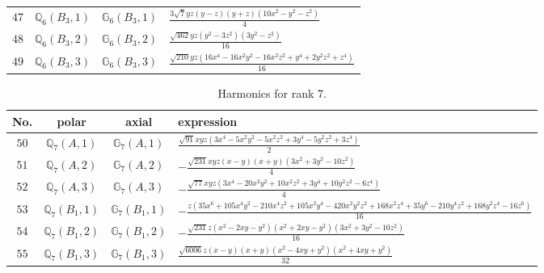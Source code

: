 \documentclass[fleqn,8pt,landscape]{jsarticle}
\begin{document}
\begin{table}[ht!]
\begin{center}
\begin{tabular}{cccl}
$ 47 $ & $ \mathbb{Q}_{6}(B_{3},1) $ & $ \mathbb{G}_{6}(B_{3},1) $ & $ \frac{3 \sqrt{7} y z \left(y - z\right) \left(y + z\right) \left(10 x^{2} - y^{2} - z^{2}\right)}{4} $ \\
$ 48 $ & $ \mathbb{Q}_{6}(B_{3},2) $ & $ \mathbb{G}_{6}(B_{3},2) $ & $ \frac{\sqrt{462} y z \left(y^{2} - 3 z^{2}\right) \left(3 y^{2} - z^{2}\right)}{16} $ \\
$ 49 $ & $ \mathbb{Q}_{6}(B_{3},3) $ & $ \mathbb{G}_{6}(B_{3},3) $ & $ \frac{\sqrt{210} y z \left(16 x^{4} - 16 x^{2} y^{2} - 16 x^{2} z^{2} + y^{4} + 2 y^{2} z^{2} + z^{4}\right)}{16} $ \\
 \hline \hline
\end{tabular}
\end{center}
\end{table}
\begin{table}[ht!]
\begin{center}
\caption{Harmonics for rank 7.}
\renewcommand{\arraystretch}{1.3}
\begin{tabular}{cccl} \hline \hline
No. & polar & axial & expression \\ \hline
$ 50 $ & $ \mathbb{Q}_{7}(A,1) $ & $ \mathbb{G}_{7}(A,1) $ & $ \frac{\sqrt{91} x y z \left(3 x^{4} - 5 x^{2} y^{2} - 5 x^{2} z^{2} + 3 y^{4} - 5 y^{2} z^{2} + 3 z^{4}\right)}{2} $ \\
$ 51 $ & $ \mathbb{Q}_{7}(A,2) $ & $ \mathbb{G}_{7}(A,2) $ & $ - \frac{\sqrt{231} x y z \left(x - y\right) \left(x + y\right) \left(3 x^{2} + 3 y^{2} - 10 z^{2}\right)}{4} $ \\
$ 52 $ & $ \mathbb{Q}_{7}(A,3) $ & $ \mathbb{G}_{7}(A,3) $ & $ - \frac{\sqrt{77} x y z \left(3 x^{4} - 20 x^{2} y^{2} + 10 x^{2} z^{2} + 3 y^{4} + 10 y^{2} z^{2} - 6 z^{4}\right)}{4} $ \\
$ 53 $ & $ \mathbb{Q}_{7}(B_{1},1) $ & $ \mathbb{G}_{7}(B_{1},1) $ & $ - \frac{z \left(35 x^{6} + 105 x^{4} y^{2} - 210 x^{4} z^{2} + 105 x^{2} y^{4} - 420 x^{2} y^{2} z^{2} + 168 x^{2} z^{4} + 35 y^{6} - 210 y^{4} z^{2} + 168 y^{2} z^{4} - 16 z^{6}\right)}{16} $ \\
$ 54 $ & $ \mathbb{Q}_{7}(B_{1},2) $ & $ \mathbb{G}_{7}(B_{1},2) $ & $ - \frac{\sqrt{231} z \left(x^{2} - 2 x y - y^{2}\right) \left(x^{2} + 2 x y - y^{2}\right) \left(3 x^{2} + 3 y^{2} - 10 z^{2}\right)}{16} $ \\
$ 55 $ & $ \mathbb{Q}_{7}(B_{1},3) $ & $ \mathbb{G}_{7}(B_{1},3) $ & $ \frac{\sqrt{6006} z \left(x - y\right) \left(x + y\right) \left(x^{2} - 4 x y + y^{2}\right) \left(x^{2} + 4 x y + y^{2}\right)}{32} $ \\

\end{tabular}
\end{center}
\end{table}
\end{document}
